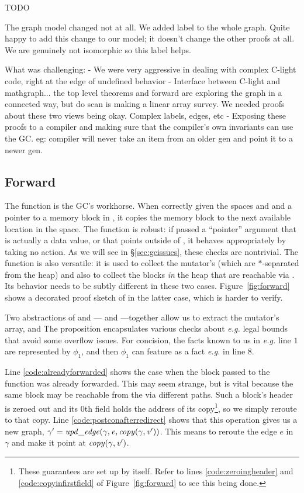 \hide
{\color{red} TODO

The graph model changed not at all. We added label to the whole graph. Quite happy to add this change to our model; it doesn't change the other proofs at all. We are genuinely not isomorphic so this label helps.

What was challenging:
	- We were very aggressive in dealing with complex C-light code, right at the edge of undefined behavior
	- Interface between C-light and mathgraph... the top level theorems and forward are exploring the graph in a connected way, but do scan is making a linear array survey. We needed proofs about these two views being okay. Complex labels, edges, etc
	- Exposing these proofs to a compiler and making sure that the compiler's own invariants can use the GC. eg: compiler will never take an item from an older gen and point it to a newer gen.
}

\subsection{Forward}
\label{sec:gcforward}
The function  is the GC's workhorse.
When correctly given the spaces  and  and a pointer
 to a memory block in ,
it copies the memory block to the next
available location in the  space.
The function is robust: if passed a ``pointer'' argument
that is actually a data value, or that points outside of
, it behaves appropriately by taking no action.
As we will see in \S\ref{sec:gcissues}, these checks are nontrivial.
The function is also versatile: it is used to collect the
mutator's  (which are $*$-separated from the heap)
and also to collect the blocks \emph{in} the heap that are reachable via
. Its behavior needs to be subtly different in these
two cases.
Figure~\ref{fig:forward} shows a decorated proof sketch of 
in the latter case, which is harder to verify. 

Two abstractions of  
and --- and ---together allow us to
extract the mutator's  array, and The
proposition  encapsulates various checks
about \emph{e.g.} legal bounds that avoid some overflow issues.  For
concision, the facts known to us in
\emph{e.g.} line $1$ are represented by $\phi_1$, and then $\phi_1$ 
can feature as a fact \emph{e.g.} in line $8$. 

Line \ref{code:alreadyforwarded} shows
the case when the block passed to the function was already forwarded.
This may seem strange, but is vital because the same block may be 
reachable from the  via different paths.
Such a block's header is zeroed out and its $0$th field holds 
the address of its 
copy\footnote{These guarantees are set up by  itself. 
Refer to lines \ref{code:zeroingheader} and 
\ref{code:copyinfirstfield} of Figure~\ref{fig:forward} to see this being done.}, 
so we simply reroute to that copy. 
Line \ref{code:postconafterredirect} shows that this operation 
gives us a new graph, $\gamma'=\mathit{upd\_edge}(\gamma, \mathit{e}, \mathit{copy}(\gamma, \mathit{v'}))$.
This means to reroute the edge $e$ in $\gamma$ and make it point at
$\mathit{copy}(\gamma, \mathit{v'})$.

